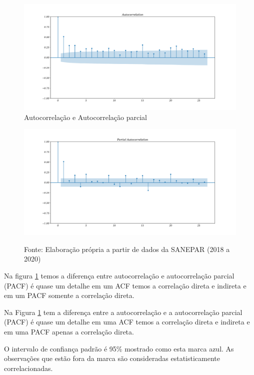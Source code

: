 \begin{figure}[H]
	\centering
		\caption{Autocorrelação e Autocorrelação parcial}
	\label{fig:acf}
	\includegraphics[width=1.1\linewidth]{Resultados/Figuras/acf} 
	
\end{figure}	
\begin{figure}[H]
	\centering
		\includegraphics[width=1.1\linewidth]{Resultados/Figuras/pacf}

	Fonte: Elaboração própria a partir de dados da SANEPAR (2018 a 2020)
\end{figure}

Na figura \ref{fig:acf} temos a diferença entre autocorrelação e autocorrelação parcial (PACF) é quase um detalhe em um ACF temos a correlação direta e indireta e em um PACF somente a correlação direta.  

Na Figura \ref{fig:acf} tem a diferença entre a autocorrelação e a autocorrelação parcial (PACF) é quase um detalhe em uma ACF temos a correlação direta e indireta e em uma PACF apenas a correlação direta. 

O intervalo de confiança padrão é 95\% mostrado como esta marca azul. As observações que estão fora da marca são consideradas estatisticamente correlacionadas.

